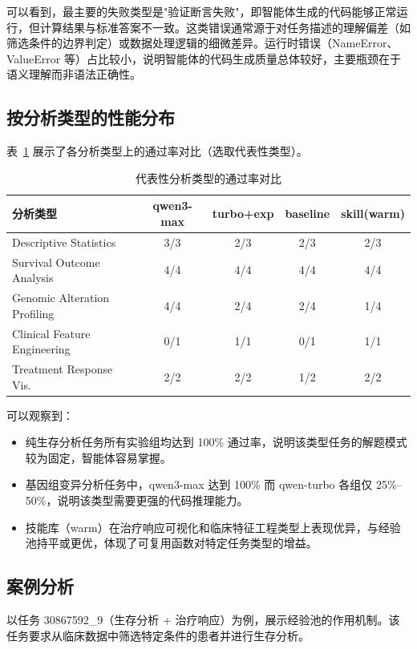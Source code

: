 可以看到，最主要的失败类型是"验证断言失败"，即智能体生成的代码能够正常运行，但计算结果与标准答案不一致。这类错误通常源于对任务描述的理解偏差（如筛选条件的边界判定）或数据处理逻辑的细微差异。运行时错误（NameError、ValueError 等）占比较小，说明智能体的代码生成质量总体较好，主要瓶颈在于语义理解而非语法正确性。

\subsection{按分析类型的性能分布}

表~\ref{tab:by-type} 展示了各分析类型上的通过率对比（选取代表性类型）。

\begin{table}[htbp]
    \centering
    \caption{代表性分析类型的通过率对比}
    \label{tab:by-type}
    \begin{tabular}{lcccc}
        \toprule
        分析类型 & qwen3-max & turbo+exp & baseline & skill(warm) \\
        \midrule
        Descriptive Statistics & 3/3 & 2/3 & 2/3 & 2/3 \\
        Survival Outcome Analysis & 4/4 & 4/4 & 4/4 & 4/4 \\
        Genomic Alteration Profiling & 4/4 & 2/4 & 2/4 & 1/4 \\
        Clinical Feature Engineering & 0/1 & 1/1 & 0/1 & 1/1 \\
        Treatment Response Vis. & 2/2 & 2/2 & 1/2 & 2/2 \\
        \bottomrule
    \end{tabular}
\end{table}

可以观察到：
\begin{itemize}
    \item 纯生存分析任务所有实验组均达到 100\% 通过率，说明该类型任务的解题模式较为固定，智能体容易掌握。
    \item 基因组变异分析任务中，qwen3-max 达到 100\% 而 qwen-turbo 各组仅 25\%--50\%，说明该类型需要更强的代码推理能力。
    \item 技能库（warm）在治疗响应可视化和临床特征工程类型上表现优异，与经验池持平或更优，体现了可复用函数对特定任务类型的增益。
\end{itemize}

\subsection{案例分析}

以任务 30867592\_9（生存分析 + 治疗响应）为例，展示经验池的作用机制。该任务要求从临床数据中筛选特定条件的患者并进行生存分析。

